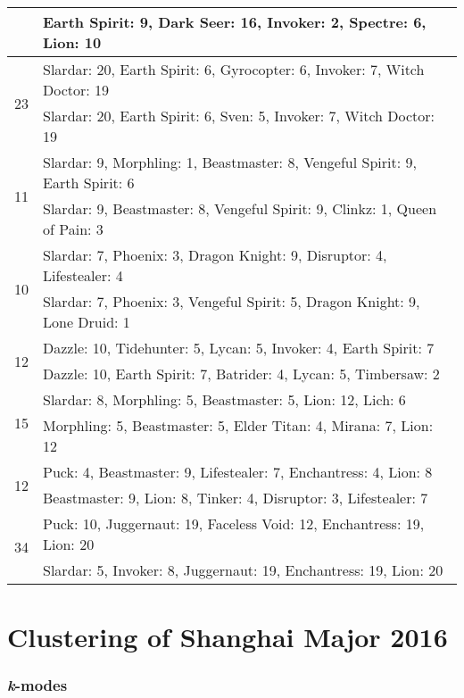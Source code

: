 \documentclass[result.tex]{subfiles}
\begin{document}
\begin{table}[H]
\begin{tabular}{ | c | p{12.5cm} | }
    & Earth Spirit: 9, Dark Seer: 16, Invoker: 2, Spectre: 6, Lion: 10 \\
    \hline
    \multirow{2}{*}{23}
    & Slardar: 20, Earth Spirit: 6, Gyrocopter: 6, Invoker: 7, Witch Doctor: 19 \\
    & Slardar: 20, Earth Spirit: 6, Sven: 5, Invoker: 7, Witch Doctor: 19 \\
    \hline
    \multirow{2}{*}{11}
    & Slardar: 9, Morphling: 1, Beastmaster: 8, Vengeful Spirit: 9, Earth Spirit: 6 \\
    & Slardar: 9, Beastmaster: 8, Vengeful Spirit: 9, Clinkz: 1, Queen of Pain: 3 \\
    \hline
    \multirow{2}{*}{10}
    & Slardar: 7, Phoenix: 3, Dragon Knight: 9, Disruptor: 4, Lifestealer: 4 \\
    & Slardar: 7, Phoenix: 3, Vengeful Spirit: 5, Dragon Knight: 9, Lone Druid: 1 \\
    \hline
    \multirow{2}{*}{12}
    & Dazzle: 10, Tidehunter: 5, Lycan: 5, Invoker: 4, Earth Spirit: 7 \\
    & Dazzle: 10, Earth Spirit: 7, Batrider: 4, Lycan: 5, Timbersaw: 2 \\
    \hline
    \multirow{2}{*}{15}
    & Slardar: 8, Morphling: 5, Beastmaster: 5, Lion: 12, Lich: 6 \\
    & Morphling: 5, Beastmaster: 5, Elder Titan: 4, Mirana: 7, Lion: 12 \\
    \hline
    \multirow{2}{*}{12}
    & Puck: 4, Beastmaster: 9, Lifestealer: 7, Enchantress: 4, Lion: 8 \\
    & Beastmaster: 9, Lion: 8, Tinker: 4, Disruptor: 3, Lifestealer: 7 \\
    \hline
    \multirow{2}{*}{34}
    & Puck: 10, Juggernaut: 19, Faceless Void: 12, Enchantress: 19, Lion: 20 \\
    & Slardar: 5, Invoker: 8, Juggernaut: 19, Enchantress: 19, Lion: 20 \\
    \hline
  \end{tabular}
  \caption{}
  \label{}
\end{table}

\newpage

\section*{Clustering of Shanghai Major 2016}

\subsubsection*{\textit{k}-modes}
\end{document}
